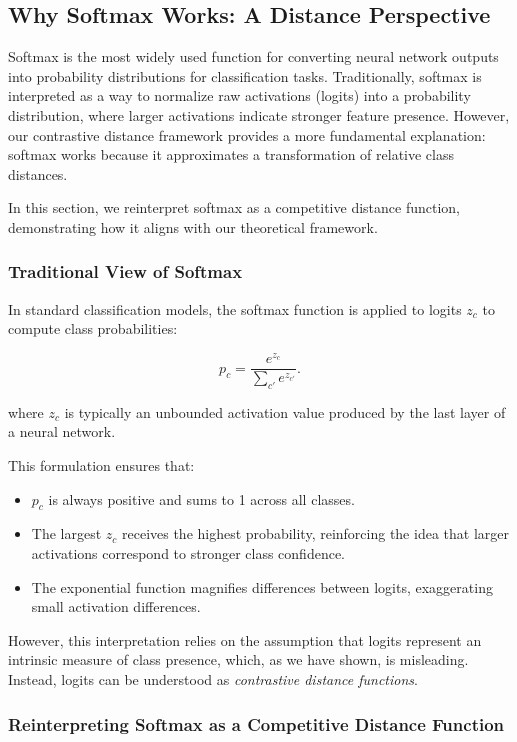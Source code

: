 \subsection{Why Softmax Works: A Distance Perspective}

Softmax is the most widely used function for converting neural network outputs into probability distributions for classification tasks. Traditionally, softmax is interpreted as a way to normalize raw activations (logits) into a probability distribution, where larger activations indicate stronger feature presence. However, our contrastive distance framework provides a more fundamental explanation: softmax works because it approximates a transformation of relative class distances.

In this section, we reinterpret softmax as a competitive distance function, demonstrating how it aligns with our theoretical framework.

\subsubsection{Traditional View of Softmax}

In standard classification models, the softmax function is applied to logits \( z_c \) to compute class probabilities:

\[
p_c = \frac{e^{z_c}}{\sum_{c'} e^{z_{c'}}}.
\]

where \( z_c \) is typically an unbounded activation value produced by the last layer of a neural network.

This formulation ensures that:

\begin{itemize}
    \item \( p_c \) is always positive and sums to 1 across all classes.
    \item The largest \( z_c \) receives the highest probability, reinforcing the idea that larger activations correspond to stronger class confidence.
    \item The exponential function magnifies differences between logits, exaggerating small activation differences.
\end{itemize}

However, this interpretation relies on the assumption that logits represent an intrinsic measure of class presence, which, as we have shown, is misleading. Instead, logits can be understood as \textit{contrastive distance functions}.

\subsubsection{Reinterpreting Softmax as a Competitive Distance Function}

